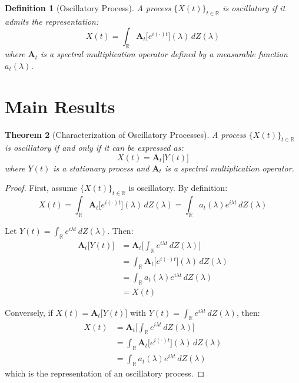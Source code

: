 \documentclass{article}
\newtheorem{theorem}{Theorem}
\newtheorem{definition}[theorem]{Definition}
\begin{document}
\begin{definition}[Oscillatory Process]
A process $\{X(t)\}_{t \in \mathbb{R}}$ is oscillatory if it admits the representation:
\begin{equation}
X(t) = \int_{\mathbb{R}} \mathbf{A}_t\big[e^{i(\cdot)t}\big](\lambda) \, dZ(\lambda)
\end{equation}
where $\mathbf{A}_t$ is a spectral multiplication operator defined by a measurable function $a_t(\lambda)$.
\end{definition}

\section{Main Results}

\begin{theorem}[Characterization of Oscillatory Processes]
A process $\{X(t)\}_{t \in \mathbb{R}}$ is oscillatory if and only if it can be expressed as:
\begin{equation}
X(t) = \mathbf{A}_t\big[Y(t)\big]
\end{equation}
where $Y(t)$ is a stationary process and $\mathbf{A}_t$ is a spectral multiplication operator.
\end{theorem}

\begin{proof}
First, assume $\{X(t)\}_{t \in \mathbb{R}}$ is oscillatory. By definition:
\begin{equation}
X(t) = \int_{\mathbb{R}} \mathbf{A}_t\big[e^{i(\cdot)t}\big](\lambda) \, dZ(\lambda) = \int_{\mathbb{R}} a_t(\lambda)e^{i\lambda t} \, dZ(\lambda)
\end{equation}

Let $Y(t) = \int_{\mathbb{R}} e^{i\lambda t} \, dZ(\lambda)$. Then:
\begin{align}
\mathbf{A}_t\big[Y(t)\big] &= \mathbf{A}_t\bigg[\int_{\mathbb{R}} e^{i\lambda t} \, dZ(\lambda)\bigg] \\
&= \int_{\mathbb{R}} \mathbf{A}_t\big[e^{i(\cdot)t}\big](\lambda) \, dZ(\lambda) \\
&= \int_{\mathbb{R}} a_t(\lambda)e^{i\lambda t} \, dZ(\lambda) \\
&= X(t)
\end{align}

Conversely, if $X(t) = \mathbf{A}_t\big[Y(t)\big]$ with $Y(t) = \int_{\mathbb{R}} e^{i\lambda t} \, dZ(\lambda)$, then:
\begin{align}
X(t) &= \mathbf{A}_t\bigg[\int_{\mathbb{R}} e^{i\lambda t} \, dZ(\lambda)\bigg] \\
&= \int_{\mathbb{R}} \mathbf{A}_t\big[e^{i(\cdot)t}\big](\lambda) \, dZ(\lambda) \\
&= \int_{\mathbb{R}} a_t(\lambda)e^{i\lambda t} \, dZ(\lambda)
\end{align}
which is the representation of an oscillatory process.
\end{proof}
\end{document}
